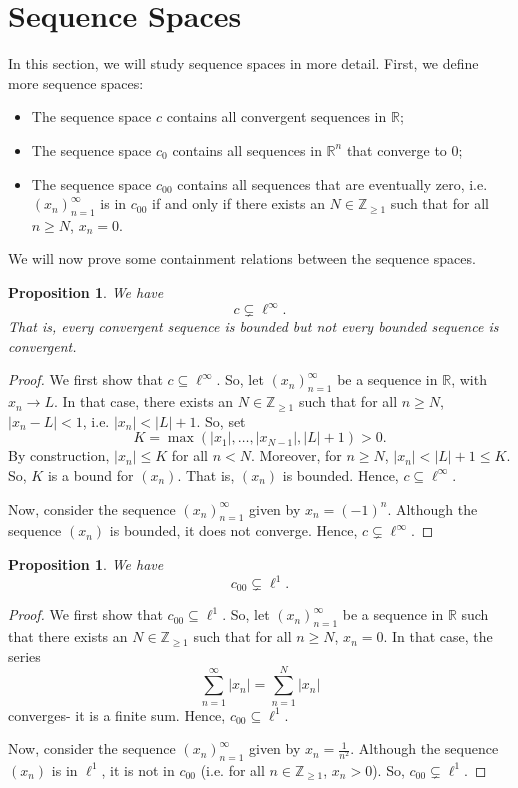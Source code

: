 \documentclass[a4paper, openany]{memoir}
\theoremstyle{definition}
\theoremstyle{plain}
\newtheorem{proposition}[definition]{Proposition}
\begin{document}
    \section{Sequence Spaces}
    In this section, we will study sequence spaces in more detail. First, we define more sequence spaces:
    \begin{itemize}
        \item The sequence space $c$ contains all convergent sequences in $\mathbb{R}$;
        \item The sequence space $c_0$ contains all sequences in $\mathbb{R}^n$ that converge to $0$;
        \item The sequence space $c_{00}$ contains all sequences that are eventually zero, i.e. $(x_n)_{n=1}^\infty$ is in $c_{00}$ if and only if there exists an $N \in \mathbb{Z}_{\geq 1}$ such that for all $n \geq N$, $x_n = 0$.
    \end{itemize}
    We will now prove some containment relations between the sequence spaces.
    \begin{proposition}
        We have
        \[c \subsetneq \ell^\infty.\]
        That is, every convergent sequence is bounded but not every bounded sequence is convergent.
    \end{proposition}
    \begin{proof}
        We first show that $c \subseteq \ell^\infty$. So, let $(x_n)_{n=1}^\infty$ be a sequence in $\mathbb{R}$, with $x_n \to L$. In that case, there exists an $N \in \mathbb{Z}_{\geq 1}$ such that for all $n \geq N$, $|x_n - L| < 1$, i.e. $|x_n| < |L| + 1$. So, set 
        \[K = \max(|x_1|, \dots, |x_{N-1}|, |L| + 1) > 0.\]
        By construction, $|x_n| \leq K$ for all $n < N$. Moreover, for $n \geq N$, $|x_n| < |L| + 1 \leq K$. So, $K$ is a bound for $(x_n)$. That is, $(x_n)$ is bounded. Hence, $c \subseteq \ell^\infty$.

        Now, consider the sequence $(x_n)_{n=1}^\infty$ given by $x_n = (-1)^n$. Although the sequence $(x_n)$ is bounded, it does not converge. Hence, $c \subsetneq \ell^\infty$.
    \end{proof}

    \begin{proposition}
        We have
        \[c_{00} \subsetneq \ell^1.\]
    \end{proposition}
    \begin{proof}
        We first show that $c_{00} \subseteq \ell^1$. So, let $(x_n)_{n=1}^\infty$ be a sequence in $\mathbb{R}$ such that there exists an $N \in \mathbb{Z}_{\geq 1}$ such that for all $n \geq N$, $x_n = 0$. In that case, the series
        \[\sum_{n=1}^\infty |x_n| = \sum_{n=1}^N |x_n|\]
        converges- it is a finite sum. Hence, $c_{00} \subseteq \ell^1$.

        Now, consider the sequence $(x_n)_{n=1}^\infty$ given by $x_n = \frac{1}{n^2}$. Although the sequence $(x_n)$ is in $\ell^1$, it is not in $c_{00}$ (i.e. for all $n \in \mathbb{Z}_{\geq 1}$, $x_n > 0$). So, $c_{00} \subsetneq \ell^1$.
    \end{proof}
\end{document}
